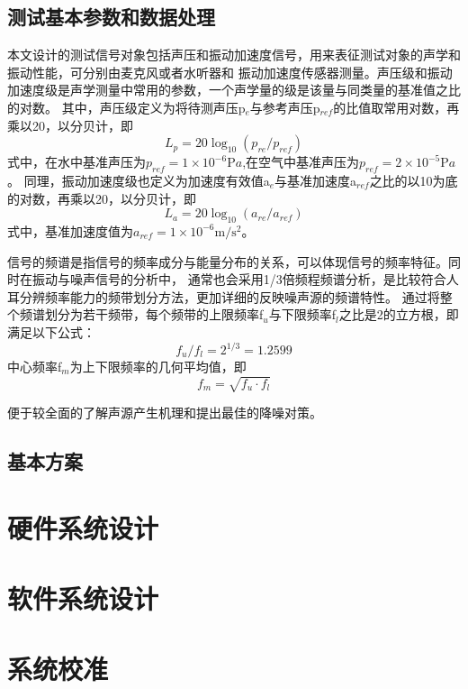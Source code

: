 \subsection{测试基本参数和数据处理}
本文设计的测试信号对象包括声压和振动加速度信号，用来表征测试对象的声学和振动性能，可分别由麦克风或者水听器和
振动加速度传感器测量。声压级和振动加速度级是声学测量中常用的参数，一个声学量的级是该量与同类量的基准值之比的对数。
其中，声压级定义为将待测声压p$_e$与参考声压p$_{ref}$的比值取常用对数，再乘以20，以分贝计，即
\begin{equation}
    \label{equ:sample}
    L_{p} = 20\log_{10}{\left(p_{re}/p_{ref}\right )}
\end{equation}
式中，在水中基准声压为$p_{ref}= 1\times 10^{-6} \mathrm{P} a$,在空气中基准声压为$p_{ref}= 2\times 10^{-5} \mathrm{P} a$。
同理，振动加速度级也定义为加速度有效值a$_e$与基准加速度a$_{ref}$之比的以10为底的对数，再乘以20，以分贝计，即
\begin{equation}
    \label{equ:sample}
    L_{a} = 20\log_{10}{\left(a_{re}/a_{ref}\right )}
\end{equation}
式中，基准加速度值为$a_{ref}= 1\times 10^{-6} \mathrm{m/s^2} $。

信号的频谱是指信号的频率成分与能量分布的关系，可以体现信号的频率特征。同时在振动与噪声信号的分析中，
通常也会采用1/3倍频程频谱分析，是比较符合人耳分辨频率能力的频带划分方法，更加详细的反映噪声源的频谱特性。
通过将整个频谱划分为若干频带，每个频带的上限频率f$_u$与下限频率f$_l$之比是2的立方根，即满足以下公式：
\begin{equation}
    \label{equ:sample}
    f_{u}/f_{l}=2^{1/3}=1.2599
\end{equation}
中心频率f$_{m}$为上下限频率的几何平均值，即
\begin{equation}
    \label{equ:sample}
    f_{m}=\sqrt{f_{u}\cdot f_{l} } 
\end{equation}

便于较全面的了解声源产生机理和提出最佳的降噪对策。
\subsection{基本方案}
\section{硬件系统设计}
\section{软件系统设计}
\section{系统校准}
